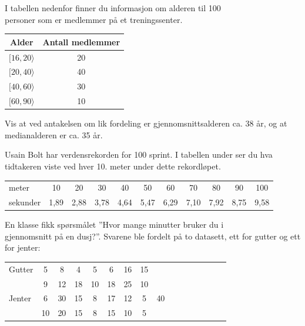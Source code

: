 I tabellen nedenfor finner du informasjon om alderen til 100\\ personer som er
medlemmer på et treningssenter.
\begin{center}
	\begin{tabular}{|c|c|}
		\hline
		Alder & Antall medlemmer \\
		\hline
		$[16, 20\rangle$ & 20 \\
		\hline
		$[20, 40\rangle$ & 40 \\
		\hline
		$[40, 60\rangle$ & 30 \\
		\hline
		$[60, 90\rangle$ & 10 \\
		\hline
	\end{tabular}
\end{center}
Vis at ved antakelsen om lik fordeling er gjennomsnittsalderen ca. 38 år, og at medianalderen er ca. 35 år.

\newpage
{}
Usain Bolt har verdensrekorden for 100 sprint. I tabellen under ser du hva tidtakeren viste ved hver 10. meter under dette rekordløpet. \vs
\begin{center}\small
	\begin{tabular}{l|c|c|c|c|c|c|c|c|c|c}
		meter & 10 & 20 & 30 & 40 & 50 & 60 & 70 & 80 & 90 & 100\\
		sekunder& 1,89 & 2,88 & 3,78 & 4,64 & 5,47 & 6,29 & 7,10 & 7,92 & 8,75 & 9,58
	\end{tabular}
\end{center}

En klasse fikk spørsmålet ''Hvor mange minutter bruker du i \\ gjennomsnitt på en dusj?''. Svarene ble fordelt på to datasett, ett for gutter og ett for jenter:
\begin{center}
	\small
	\begin{tabular}{l| c  c  c  c  c  c  c  c  c  c  c  c  c  c  c}
		
		Gutter & 5 & 8 & 4 & 5 & 6 & 16 & 15 \\
		& 9 & 12 & 18 & 10 & 18 & 25 & 10 \\ \hline
		Jenter & 6 & 30 & 15 & 8 & 17 & 12 & 5 & 40 \\
		& 10 & 20 & 15 & 8 & 15 & 10 & 5
	\end{tabular}
\end{center}

